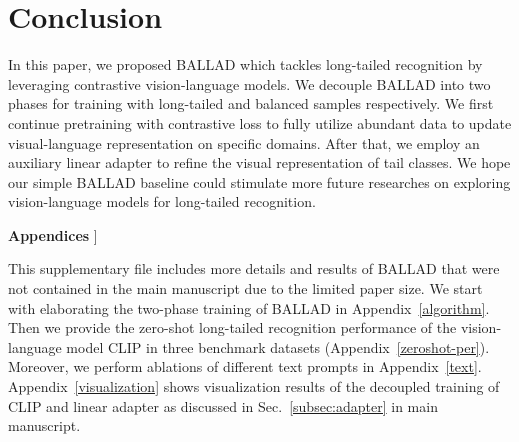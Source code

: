 \documentclass[10pt,twocolumn,letterpaper]{article}
\newcommand{\approach}{\textsc{BALLAD}}
\begin{document}
\section{Conclusion}
In this paper, we proposed \approach{} which tackles long-tailed recognition by leveraging contrastive vision-language models. 
We decouple \approach{} into two phases for training with long-tailed and balanced samples respectively. We first continue pretraining with contrastive loss to fully utilize abundant data to update visual-language representation on specific domains. After that, we employ an auxiliary linear adapter to refine the visual representation of tail classes. 
We hope our simple \approach{} baseline could stimulate more future researches on exploring vision-language models for long-tailed recognition.



{\small


}



\begin{center}
    \Large
    \textbf{Appendices}
    \10pt]
\end{center}

\appendix
This supplementary file includes more details and results of \approach{} that were not contained in the main manuscript due to the limited paper size. We start with elaborating the two-phase training of \approach{} in Appendix~\ref{algorithm}. Then we provide the zero-shot long-tailed recognition performance of the vision-language model CLIP in three benchmark datasets (Appendix~\ref{zeroshot-per}). Moreover, we perform ablations of different text prompts in Appendix~\ref{text}. Appendix~\ref{visualization} shows visualization results of the decoupled training of CLIP and linear adapter as discussed in Sec.~\ref{subsec:adapter} in main manuscript.
\end{document}
